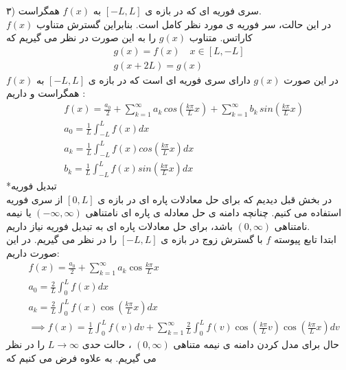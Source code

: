 ۳) سری فوریه ای که در بازه ی
$[-L,L]$
به
$f(x)$
همگراست.\\
در این حالت، سر فوریه ی مورد نظر کامل است. بنابراین گسترش متناوب
$f(x)$
کاراتس. متناوب 
$g(x)$
را به این صورت در نظر می گیریم که
\begin{equation*}
	\begin{gathered}
		g(x)=f(x)\quad x\in[L,-L] \\g(x+2L)=g(x)
	\end{gathered}
\end{equation*}
در این صورت 
$g(x)$
دارای سری فوریه ای است که در بازه ی
$[-L,L]$
به 
$f(x)$
همگراست و داریم :
\begin{equation*}
	\begin{aligned}
		{} &\
		f(x)=\frac{a_0}{2}+\sum_{k=1}^\infty{a_k \, cos\left(\frac{k\pi}{L}x\right)}+\sum_{k=1}^\infty{b_k \, sin\left(\frac{k\pi}{L}x\right)}
		\\ &\
		a_0=\frac{1}{L}\int_{-L}^{L}{f(x)dx}
		\\ &\
		a_k=\frac{1}{L}\int_{-L}^L{f(x)cos\left(\frac{k\pi}{L}x\right)dx}
		\\ &\
		b_k=\frac{1}{L}\int_{-L}^L{f(x)sin\left(\frac{k\pi}{L}x\right)dx}
	\end{aligned}
\end{equation*}
*تبدیل فوریه\\
در بخش قبل دیدیم که برای حل معادلات پاره ای در بازه ی
$[0,L]$
از سری فوریه استفاده می کنیم. چنانچه دامنه ی حل معادله ی پاره ای نامتناهی
$(-\infty,\infty)$
یا نیمه نامتناهی
$(0,\infty)$
باشد، برای حل معادلات پاره ای به تبدیل فوریه نیاز داریم.\\
ابتدا تابع پیوسته
$f$
با گسترش زوج در بازه ی
$[-L,L]$
را در نظر می گیریم. در این صورت داریم:
\begin{equation*}
	\begin{aligned}
		{} &\
		f(x)=\frac{a_{0}}{2}+\sum_{k=1}^{\infty} a_{k} \cos \frac{k \pi}{L} x
		\\ &\
		a_{0}=\frac{2}{L} \int_{0}^{L} f(x) d x
		\\ &\
		a_{k}=\frac{2}{L} \int_{0}^{L} f(x) \cos \left(\frac{k \pi}{L} x\right) d x
		\\ &\
		\implies f(x) = \frac{1}{L} \int_{0}^{L} {f(v) dv}+\sum_{k=1}^{\infty} {\frac{2}{L} \int_{0}^{L} {f(v) \cos \left(\frac{k \pi}{L} v\right) \cos \left(\frac{k \pi}{L} x\right) d v}}
	\end{aligned}
\end{equation*}
حال برای مدل کردن دامنه ی نیمه متناهی 
$(0,\infty)$
، حالت حدی 
$L\to \infty$
را در نظر می گیریم. به علاوه فرض می کنیم که
